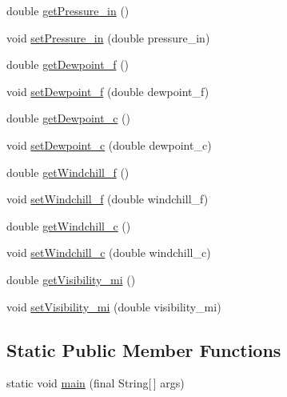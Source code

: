 \begin{DoxyCompactItemize}
\item 
double \hyperlink{classgov_1_1fnal_1_1ppd_1_1dd_1_1testing_1_1news_1_1current__observation_a97f990556a181e3acfc79f490c1ad517}{get\-Pressure\-\_\-in} ()
\item 
void \hyperlink{classgov_1_1fnal_1_1ppd_1_1dd_1_1testing_1_1news_1_1current__observation_a08f4534bebbdee1dbd18e6ca33a6e056}{set\-Pressure\-\_\-in} (double pressure\-\_\-in)
\item 
double \hyperlink{classgov_1_1fnal_1_1ppd_1_1dd_1_1testing_1_1news_1_1current__observation_a09e31f8bf7a9f1226bf2f3485ff9167e}{get\-Dewpoint\-\_\-f} ()
\item 
void \hyperlink{classgov_1_1fnal_1_1ppd_1_1dd_1_1testing_1_1news_1_1current__observation_a7a28601d84b4952ffb34de1d68f44e6d}{set\-Dewpoint\-\_\-f} (double dewpoint\-\_\-f)
\item 
double \hyperlink{classgov_1_1fnal_1_1ppd_1_1dd_1_1testing_1_1news_1_1current__observation_a0d2b741c0e560fe37ff99f9c0660b8b8}{get\-Dewpoint\-\_\-c} ()
\item 
void \hyperlink{classgov_1_1fnal_1_1ppd_1_1dd_1_1testing_1_1news_1_1current__observation_a6f94a1acaae9b4fbfd0bf63396d9a821}{set\-Dewpoint\-\_\-c} (double dewpoint\-\_\-c)
\item 
double \hyperlink{classgov_1_1fnal_1_1ppd_1_1dd_1_1testing_1_1news_1_1current__observation_a4922a0f5e1867b6e34933c4b3d64ed02}{get\-Windchill\-\_\-f} ()
\item 
void \hyperlink{classgov_1_1fnal_1_1ppd_1_1dd_1_1testing_1_1news_1_1current__observation_ac1b536c8885742c7e3213c40aec93d65}{set\-Windchill\-\_\-f} (double windchill\-\_\-f)
\item 
double \hyperlink{classgov_1_1fnal_1_1ppd_1_1dd_1_1testing_1_1news_1_1current__observation_a15dfd4908d5b3d1e8e6a225dee94d52a}{get\-Windchill\-\_\-c} ()
\item 
void \hyperlink{classgov_1_1fnal_1_1ppd_1_1dd_1_1testing_1_1news_1_1current__observation_a9281951d7d0b2438ce6e7065a51e19ce}{set\-Windchill\-\_\-c} (double windchill\-\_\-c)
\item 
double \hyperlink{classgov_1_1fnal_1_1ppd_1_1dd_1_1testing_1_1news_1_1current__observation_a66f6f0b86925d3cf7e46b2ba37b64c8a}{get\-Visibility\-\_\-mi} ()
\item 
void \hyperlink{classgov_1_1fnal_1_1ppd_1_1dd_1_1testing_1_1news_1_1current__observation_a014248a08b5dffe8dcaed5adf50558d2}{set\-Visibility\-\_\-mi} (double visibility\-\_\-mi)
\end{DoxyCompactItemize}
\subsection*{Static Public Member Functions}
\begin{DoxyCompactItemize}
\item 
static void \hyperlink{classgov_1_1fnal_1_1ppd_1_1dd_1_1testing_1_1news_1_1current__observation_aa71470601efe1d029602b977a4c0cbdc}{main} (final String\mbox{[}$\,$\mbox{]} args)
\end{DoxyCompactItemize}



